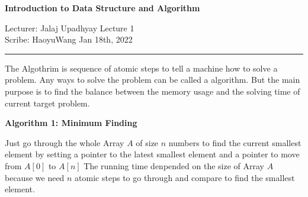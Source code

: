 \documentclass[11pt]{article}
\begin{document}
\thispagestyle{empty}


\begin{center}
\bf\large Introduction to Data Structure and Algorithm
\end{center}

\noindent
Lecturer: Jalaj Upadhyay   %
\hfill
Lecture 1\               %
\\
Scribe: HaoyuWang                 %
\hfill
Jan 18th, 2022           %

\noindent
\rule{\textwidth}{1pt}

\medskip

The Algothrim is sequence of atomic steps to tell a machine how to solve a problem. 
Any ways to solve the problem can be called a algorithm. 
But the main purpose is to find the balance between the memory usage and the solving time of current target problem.

{\bf Algorithm 1: Minimum Finding}

Just go through the whole Array $A$ of size $n$ numbers to find the current smallest element by setting a pointer to the latest smallest element and a pointer to move from $A[0]$ to $A[n]$
The running time denpended on the size of Array $A$ because we need $n$ atomic steps to go through and compare to find the smallest element.













\end{document}
